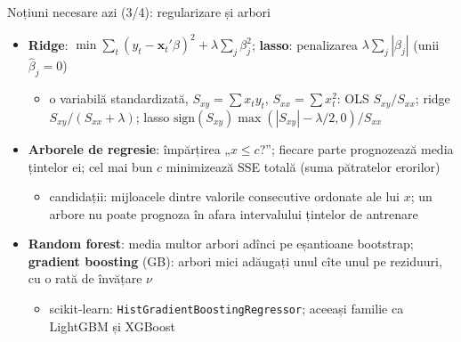 \begin{frame}{Noțiuni necesare azi (3/4): regularizare și arbori}
\itemsize{\footnotesize}
\begin{itemize}
    \item \textbf{Ridge}: $\min \sum_t (y_t - \mathbf{x}_t'\beta)^2 + \lambda\sum_j\beta_j^2$; \textbf{lasso}: penalizarea $\lambda\sum_j|\beta_j|$ (unii $\hat\beta_j = 0$)
    \begin{itemize}
        \item o variabilă standardizată, $S_{xy} = \sum x_ty_t$, $S_{xx} = \sum x_t^2$: OLS $S_{xy}/S_{xx}$; ridge $S_{xy}/(S_{xx} + \lambda)$; lasso $\mathrm{sign}(S_{xy})\max(|S_{xy}| - \lambda/2, 0)/S_{xx}$
    \end{itemize}
    \item \textbf{Arborele de regresie}: împărțirea „$x \le c$?”; fiecare parte prognozează media țintelor ei; cel mai bun $c$ minimizează SSE totală (suma pătratelor erorilor)
    \begin{itemize}
        \item candidații: mijloacele dintre valorile consecutive ordonate ale lui $x$; un arbore nu poate prognoza în afara intervalului țintelor de antrenare
    \end{itemize}
    \item \textbf{Random forest}: media multor arbori adînci pe eșantioane bootstrap; \textbf{gradient boosting} (GB): arbori mici adăugați unul cîte unul pe reziduuri, cu o rată de învățare $\nu$
    \begin{itemize}
        \item scikit-learn: \texttt{HistGradientBoostingRegressor}; aceeași familie ca LightGBM și XGBoost
    \end{itemize}
\end{itemize}
\end{frame}

